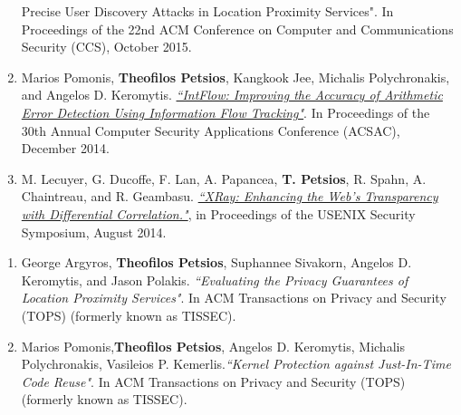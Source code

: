 \begin{cvparagraph}
\begin{enumerate}[label=C\arabic*]
{{        Precise User Discovery Attacks in Location Proximity Services"}}. In
        Proceedings of the 22nd ACM Conference on Computer and Communications
        Security (CCS), October 2015.\label{itm:istalker}
    \item Marios Pomonis, \textbf{Theofilos Petsios}, Kangkook Jee, Michalis
        Polychronakis, and Angelos D. Keromytis. \href{http://www.cs.columbia.edu/~theofilos/files/papers/2014/intflow.pdf}{\textit{``IntFlow: Improving
        the Accuracy of Arithmetic Error Detection Using Information Flow
        Tracking"}}. In Proceedings of the 30th Annual Computer Security
        Applications Conference (ACSAC), December 2014.\label{itm:intflow}
    \item M. Lecuyer, G. Ducoffe, F. Lan, A. Papancea, \textbf{T. Petsios}, R.
        Spahn, A. Chaintreau, and R. Geambasu. \href{http://www.cs.columbia.edu/~theofilos/files/papers/2014/xray.pdf}{\textit{``XRay: Enhancing the
        Web's Transparency with Differential Correlation."}}, in Proceedings of
        the USENIX Security Symposium, August 2014.\label{itm:xray}
\end{enumerate}
\end{cvparagraph}

\pagebreak

\begin{cvparagraph}
\begin{enumerate}[label=J\arabic*]
    \item George Argyros, \textbf{Theofilos Petsios}, Suphannee Sivakorn,
        Angelos D. Keromytis, and Jason Polakis. \textit{``Evaluating the
        Privacy Guarantees of Location Proximity Services"}. In ACM
        Transactions on Privacy and Security (TOPS) (formerly known as
        TISSEC).\label{itm:istalker_tops}
    \item Marios Pomonis,\textbf{Theofilos Petsios}, Angelos D. Keromytis,
        Michalis Polychronakis, Vasileios P. Kemerlis.\textit{``Kernel
        Protection against Just-In-Time Code Reuse"}. In ACM Transactions on
        Privacy and Security (TOPS) (formerly known as
        TISSEC).\label{itm:krx_tops}
\end{enumerate}
\end{cvparagraph}


